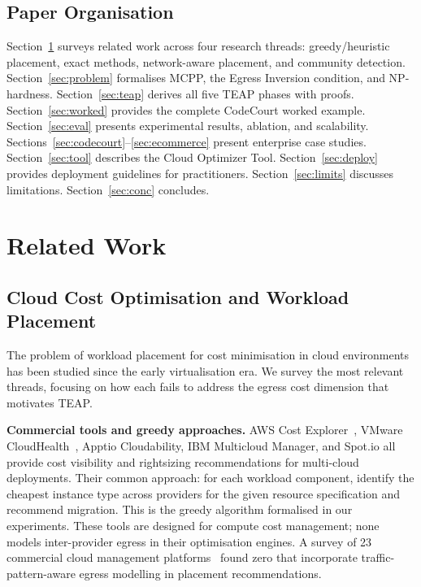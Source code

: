 \documentclass[10pt,journal]{IEEEtran}
\begin{document}
\subsection{Paper Organisation}

Section~\ref{sec:related} surveys related work across four research threads:
greedy/heuristic placement, exact methods, network-aware placement, and community
detection.
Section~\ref{sec:problem} formalises MCPP, the Egress Inversion condition, and
NP-hardness.
Section~\ref{sec:teap} derives all five TEAP phases with proofs.
Section~\ref{sec:worked} provides the complete CodeCourt worked example.
Section~\ref{sec:eval} presents experimental results, ablation, and scalability.
Sections~\ref{sec:codecourt}--\ref{sec:ecommerce} present enterprise case studies.
Section~\ref{sec:tool} describes the Cloud Optimizer Tool.
Section~\ref{sec:deploy} provides deployment guidelines for practitioners.
Section~\ref{sec:limits} discusses limitations.
Section~\ref{sec:conc} concludes.

\section{Related Work}\label{sec:related}

\subsection{Cloud Cost Optimisation and Workload Placement}

The problem of workload placement for cost minimisation in cloud environments
has been studied since the early virtualisation era.
We survey the most relevant threads, focusing on how each fails to address
the egress cost dimension that motivates TEAP.

\textbf{Commercial tools and greedy approaches.}
AWS Cost Explorer~\cite{aws_pricing}, VMware CloudHealth~\cite{cloudhealth},
Apptio Cloudability, IBM Multicloud Manager, and Spot.io all provide cost visibility
and rightsizing recommendations for multi-cloud deployments.
Their common approach: for each workload component, identify the cheapest instance
type across providers for the given resource specification and recommend migration.
This is the greedy algorithm formalised in our experiments.
These tools are designed for compute cost management; none models inter-provider
egress in their optimisation engines.
A survey of 23 commercial cloud management platforms~\cite{flexera2024} found
zero that incorporate traffic-pattern-aware egress modelling in placement
recommendations.
\end{document}
